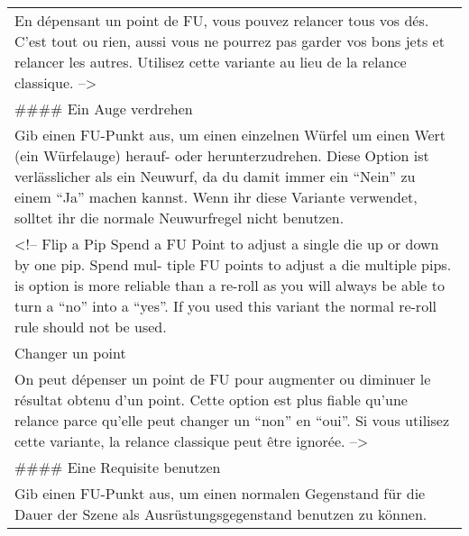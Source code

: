 \documentclass[]{article}
\begin{document}
\begin{longtable}[]{@{}l@{}}
\begin{minipage}[t]{0.05\columnwidth}
En dépensant un point de FU, vous pouvez relancer tous vos dés. C'est
tout ou rien, aussi vous ne pourrez pas garder vos bons jets et relancer
les autres. Utilisez cette variante au lieu de la relance classique.
--\textgreater{}
\strut\end{minipage}\tabularnewline
\begin{minipage}[t]{0.05\columnwidth}\raggedright\strut
\#\#\#\# Ein Auge verdrehen
\strut\end{minipage}\tabularnewline
\begin{minipage}[t]{0.05\columnwidth}\raggedright\strut
Gib einen FU-Punkt aus, um einen einzelnen Würfel um einen Wert (ein
Würfelauge) herauf- oder herunterzudrehen. Diese Option ist
verlässlicher als ein Neuwurf, da du damit immer ein ``Nein'' zu einem
``Ja'' machen kannst. Wenn ihr diese Variante verwendet, solltet ihr die
normale Neuwurfregel nicht benutzen.
\strut\end{minipage}\tabularnewline
\begin{minipage}[t]{0.05\columnwidth}\raggedright\strut
\textless{}!-- Flip a Pip Spend a FU Point to adjust a single die up or
down by one pip. Spend mul- tiple FU points to adjust a die multiple
pips. is option is more reliable than a re-roll as you will always be
able to turn a ``no'' into a ``yes''. If you used this variant the
normal re-roll rule should not be used.
\strut\end{minipage}\tabularnewline
\begin{minipage}[t]{0.05\columnwidth}\raggedright\strut
Changer un point
\strut\end{minipage}\tabularnewline
\begin{minipage}[t]{0.05\columnwidth}\raggedright\strut
On peut dépenser un point de FU pour augmenter ou diminuer le résultat
obtenu d'un point. Cette option est plus fiable qu'une relance parce
qu'elle peut changer un ``non'' en ``oui''. Si vous utilisez cette
variante, la relance classique peut être ignorée. --\textgreater{}
\strut\end{minipage}\tabularnewline
\begin{minipage}[t]{0.05\columnwidth}\raggedright\strut
\#\#\#\# Eine Requisite benutzen
\strut\end{minipage}\tabularnewline
\begin{minipage}[t]{0.05\columnwidth}\raggedright\strut
Gib einen FU-Punkt aus, um einen normalen Gegenstand für die Dauer der
Szene als Ausrüstungsgegenstand benutzen zu können.
\strut\end{minipage}\tabularnewline

\end{longtable}
\end{document}
